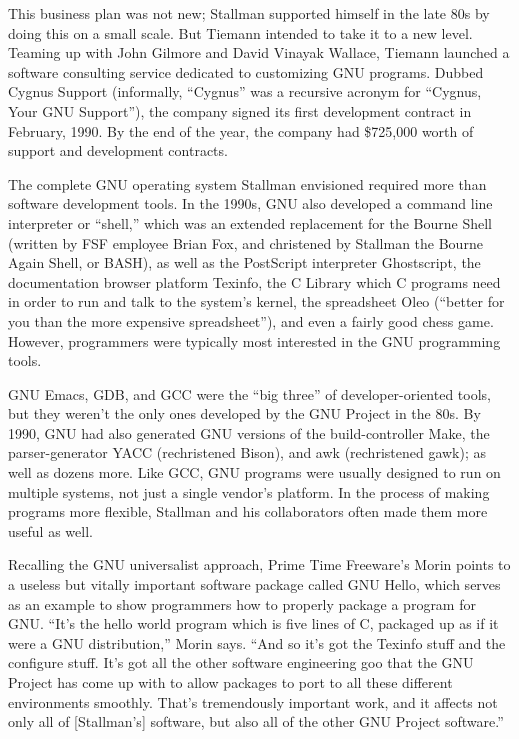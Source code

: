 This business plan was not new; Stallman supported himself in the late 80s by doing this on a small scale.  But Tiemann intended to take it to a new level.
Teaming up with John Gilmore and David Vinayak Wallace, Tiemann launched a software consulting service dedicated to customizing GNU programs. Dubbed Cygnus Support (informally, ``Cygnus'' was a recursive acronym for ``Cygnus, Your GNU Support''), the company signed its first development contract in February, 1990. By the end of the year, the company had \$725,000 worth of support and development contracts.

The complete GNU operating system Stallman envisioned required more than software development tools.  In the 1990s, GNU also developed a command line interpreter or ``shell,'' which was an extended replacement for the Bourne Shell (written by FSF employee Brian Fox, and christened by Stallman the Bourne Again Shell, or BASH), as well as the PostScript interpreter Ghostscript, the documentation browser platform Texinfo, the C Library which C programs need in order to run and talk to the system's kernel, the spreadsheet Oleo (``better for you than the more expensive spreadsheet''), and even a fairly good chess game.  However, programmers were typically most interested in the GNU programming tools.

GNU Emacs, GDB, and GCC were the ``big three'' of developer-oriented tools, but they weren't the only ones developed by the GNU Project in the 80s. By 1990, GNU had also generated GNU versions of the build-controller Make, the parser-generator YACC (rechristened Bison), and awk (rechristened gawk); as well as dozens more. Like GCC, GNU programs were usually designed to run on multiple systems, not just a single vendor's platform. In the process of making programs more flexible, Stallman and his collaborators often made them more useful as well.

Recalling the GNU universalist approach, Prime Time Freeware's Morin points to a useless but vitally important software package called GNU Hello, which serves as an example to show programmers how to properly package a program for GNU. ``It's the hello world program which is five lines of C, packaged up as if it were a GNU distribution,'' Morin says. ``And so it's got the Texinfo stuff and the configure stuff. It's got all the other software engineering goo that the GNU Project has come up with to allow packages to port to all these different environments smoothly. That's tremendously important work, and it affects not only all of [Stallman's] software, but also all of the other GNU Project software.''


